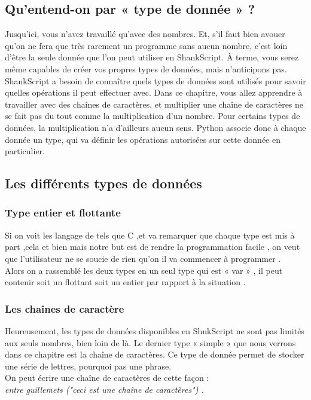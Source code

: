 \subsection*{Qu'entend-on par « type de donnée » ?}

Jusqu'ici, vous n'avez travaillé qu'avec des nombres. Et, s'il faut bien avouer qu'on ne fera que très rarement un programme sans aucun nombre, c'est loin d'être la seule donnée que l'on peut utiliser en ShankScript. À terme, vous serez même capables de créer vos propres types de données, mais n'anticipons pas.
\\[0.5cm]
ShankScript a besoin de connaître quels types de données sont utilisés pour savoir quelles opérations il peut effectuer avec. Dans ce chapitre, vous allez apprendre à travailler avec des chaînes de caractères, et multiplier une chaîne de caractères ne se fait pas du tout comme la multiplication d'un nombre. Pour certains types de données, la multiplication n'a d'ailleurs aucun sens. Python associe donc à chaque donnée un type, qui va définir les opérations autorisées sur cette donnée en particulier.
\subsection*{Les différents types de données}
\subsubsection*{Type entier et flottante}
Si on voit les langage de tels que C ,et va remarquer que chaque type est mis à part ,cela et bien mais notre but est de  rendre la programmation facile , on veut que l'utilisateur ne se soucie de rien qu'on il va commencer à programmer .
\\[0.5cm]
Alors on a rassemblé les deux types en un seul type qui est « var » , il peut contenir soit un flottant soit un entier par rapport à la situation .
\subsubsection*{Les chaînes de caractère }
Heureusement, les types de données disponibles en ShnkScript ne sont pas limités aux seuls nombres, bien loin de là. Le dernier type « simple » que nous verrons dans ce chapitre est la chaîne de caractères. Ce type de donnée permet de stocker une série de lettres, pourquoi pas une phrase.
\\[0.5cm]
On peut écrire une chaîne de caractères de cette façon :
\\
\textit{	entre guillemets ("ceci est une chaîne de caractères") .}



